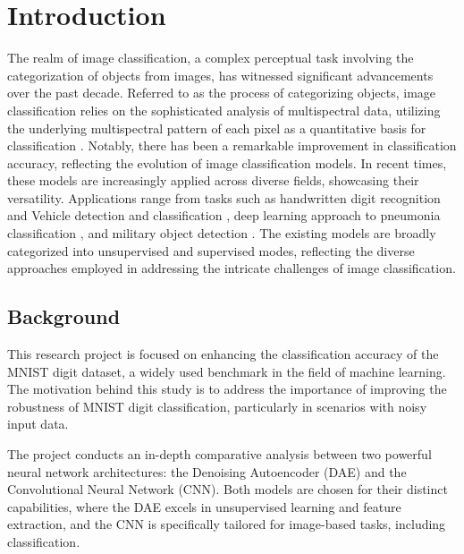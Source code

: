 \chapter{Introduction}
\label{ch:into} %
The realm of image classification, a complex perceptual task involving the categorization of 
objects from images, has witnessed significant advancements over the past decade. Referred to 
as the process of categorizing objects, image classification relies on the sophisticated 
analysis of multispectral data, utilizing the underlying multispectral pattern of each pixel as 
a quantitative basis for classification \citep{lillesand2015remote}. Notably, there has been a 
remarkable improvement in classification accuracy, reflecting the evolution of image 
classification models. In recent times, these models are increasingly applied across diverse 
fields, showcasing their versatility. Applications range from tasks such as handwritten digit 
recognition \citep{ahlawat2020improved} and  Vehicle detection and classification 
\citep{tsai2018vehicle}, deep learning approach to pneumonia classification 
\citep{stephen2019efficient}, and military object detection \citep{janakiramaiah2023military}. 
The existing models are broadly categorized into unsupervised and supervised modes, reflecting 
the diverse approaches employed in addressing the intricate challenges of image classification.



\section{Background}
\label{sec:into_back}
This research project is focused on enhancing the classification accuracy of the MNIST digit 
dataset, a widely used benchmark in the field of machine learning. The motivation behind this 
study is to address the importance of improving the robustness of MNIST digit classification, 
particularly in scenarios with noisy input data.

The project conducts an in-depth comparative analysis between two powerful neural network 
architectures: the Denoising Autoencoder (DAE) and the Convolutional Neural Network (CNN). Both 
models are chosen for their distinct capabilities, where the DAE excels in unsupervised 
learning and feature extraction, and the CNN is specifically tailored for image-based tasks, 
including classification.

